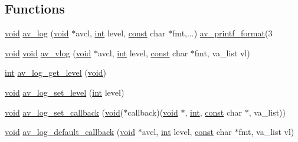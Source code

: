 \subsection*{Functions}
\begin{DoxyCompactItemize}
\item 
\hyperlink{sound_8c_ae35f5844602719cf66324f4de2a658b3}{void} \hyperlink{group__lavu__log_gabd386ffd4b27637cf34e98d5d1a6e8ae}{av\+\_\+log} (\hyperlink{sound_8c_ae35f5844602719cf66324f4de2a658b3}{void} $\ast$avcl, \hyperlink{xmltok_8h_a5a0d4a5641ce434f1d23533f2b2e6653}{int} level, \hyperlink{getopt1_8c_a2c212835823e3c54a8ab6d95c652660e}{const} char $\ast$fmt,...) \hyperlink{attributes_8h_a4b078d4b8e02c0f452ee1dcaa7d983d3}{av\+\_\+printf\+\_\+format}(3
\item 
\hyperlink{sound_8c_ae35f5844602719cf66324f4de2a658b3}{void} \hyperlink{sound_8c_ae35f5844602719cf66324f4de2a658b3}{void} \hyperlink{group__lavu__log_ga6d72fb598cff2c8385069a1fc2ee5812}{av\+\_\+vlog} (\hyperlink{sound_8c_ae35f5844602719cf66324f4de2a658b3}{void} $\ast$avcl, \hyperlink{xmltok_8h_a5a0d4a5641ce434f1d23533f2b2e6653}{int} level, \hyperlink{getopt1_8c_a2c212835823e3c54a8ab6d95c652660e}{const} char $\ast$fmt, va\+\_\+list vl)
\item 
\hyperlink{xmltok_8h_a5a0d4a5641ce434f1d23533f2b2e6653}{int} \hyperlink{group__lavu__log_gae8ada5cc5722548d8698650b05207904}{av\+\_\+log\+\_\+get\+\_\+level} (\hyperlink{sound_8c_ae35f5844602719cf66324f4de2a658b3}{void})
\item 
\hyperlink{sound_8c_ae35f5844602719cf66324f4de2a658b3}{void} \hyperlink{group__lavu__log_ga1fd32c74db581e3e2e7f35d277bb1e24}{av\+\_\+log\+\_\+set\+\_\+level} (\hyperlink{xmltok_8h_a5a0d4a5641ce434f1d23533f2b2e6653}{int} level)
\item 
\hyperlink{sound_8c_ae35f5844602719cf66324f4de2a658b3}{void} \hyperlink{group__lavu__log_ga14034761faf581a8b9ed6ef19b313708}{av\+\_\+log\+\_\+set\+\_\+callback} (\hyperlink{sound_8c_ae35f5844602719cf66324f4de2a658b3}{void}($\ast$callback)(\hyperlink{sound_8c_ae35f5844602719cf66324f4de2a658b3}{void} $\ast$, \hyperlink{xmltok_8h_a5a0d4a5641ce434f1d23533f2b2e6653}{int}, \hyperlink{getopt1_8c_a2c212835823e3c54a8ab6d95c652660e}{const} char $\ast$, va\+\_\+list))
\item 
\hyperlink{sound_8c_ae35f5844602719cf66324f4de2a658b3}{void} \hyperlink{group__lavu__log_ga5bd132d2e4ac6f9843ef6d8e3c05050a}{av\+\_\+log\+\_\+default\+\_\+callback} (\hyperlink{sound_8c_ae35f5844602719cf66324f4de2a658b3}{void} $\ast$avcl, \hyperlink{xmltok_8h_a5a0d4a5641ce434f1d23533f2b2e6653}{int} level, \hyperlink{getopt1_8c_a2c212835823e3c54a8ab6d95c652660e}{const} char $\ast$fmt, va\+\_\+list vl)

\end{DoxyCompactItemize}
